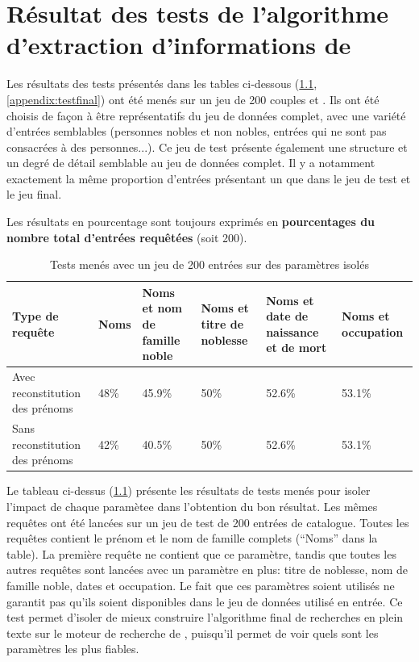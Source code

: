 \chapter{Résultat des tests de l'algorithme d'extraction d'informations de \wkd{}}

Les résultats des tests présentés dans les tables ci-dessous (\ref{appendix:testisolate}, \ref{appendix:testfinal}) ont été menés sur un jeu de 200 couples \tname{} et \ttrait{}. Ils ont été choisis de façon à être représentatifs du jeu de données complet, avec une variété d'entrées semblables (personnes nobles et non nobles, entrées qui ne sont pas consacrées à des personnes...). Ce jeu de test présente également une structure et un degré de détail semblable au jeu de données complet. Il y a notamment exactement la même proportion d'entrées présentant un \ttrait{} que dans le jeu de test et le jeu final.

Les résultats en pourcentage sont toujours exprimés en \textbf{pourcentages du nombre total d'entrées requêtées} (soit 200).
\pagebreak

\begin{table}[h]
	\centering
	\begin{tabular}{>{\centering}m{3cm}m{2cm}m{2cm}m{2cm}m{2cm}m{2cm}}
		\hline
		\textbf{Type de requête} & \textbf{Noms} & \textbf{Noms et nom de famille noble} & \textbf{Noms et titre de noblesse} & \textbf{Noms et date de naissance et de mort} & \textbf{Noms et occupation} \\
		\hline
		\hline
		Avec reconstitution des prénoms & 48\% & 45.9\% & 50\% & 52.6\% & 53.1\% \\
		\hline
		Sans reconstitution des prénoms & 42\% & 40.5\% & 50\% & 52.6\% & 53.1\% \\
		\hline	
	\end{tabular}
	\caption{Tests menés avec un jeu de 200 entrées sur des paramètres isolés}
	\label{appendix:testisolate}
\end{table}

Le tableau ci-dessus (\ref{appendix:testisolate}) présente les résultats de tests menés pour isoler l'impact de chaque paramètee dans l'obtention du bon résultat. Les mêmes requêtes ont été lancées sur un jeu de test de 200 entrées de catalogue. Toutes les requêtes contient le prénom et le nom de famille complets (\enquote{Noms} dans la table). La première requête ne contient que ce paramètre, tandis que toutes les autres requêtes sont lancées avec un paramètre en plus: titre de noblesse, nom de famille noble, dates et occupation. Le fait que ces paramètres soient utilisés ne garantit pas qu'ils soient disponibles dans le jeu de données utilisé en entrée.  Ce test permet d'isoler de mieux construire l'algorithme final de recherches en plein texte sur le moteur de recherche de \wkd{}, puisqu'il permet de voir quels sont les paramètres les plus fiables.
\vfill
\clearpage


